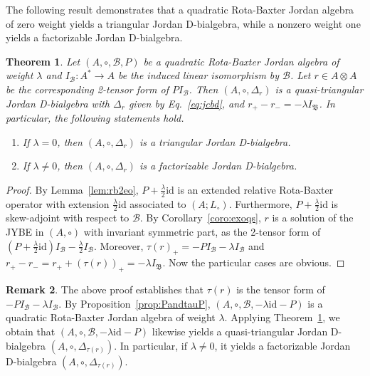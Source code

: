 \documentclass[12pt, reqno, a4paper]{amsart}
\newtheorem{theorem}{Theorem}[section]
\theoremstyle{definition}
\newtheorem{remark}[theorem]{Remark}
\newcommand{\id}{\mathrm{id}}
\begin{document}
The following result demonstrates that a quadratic Rota-Baxter Jordan algebra of zero weight yields a triangular Jordan D-bialgebra, while a nonzero weight one yields a factorizable Jordan D-bialgebra.
\begin{theorem}\label{thm:qrbj2qtjb}
	Let $(A, \circ, \mathcal{B}, P)$ be a quadratic Rota-Baxter Jordan algebra of weight $\lambda$ and $I_\mathcal{B}: A^* \to A$ be the induced linear isomorphism by $\mathcal{B}$.
	Let $r\in A \otimes A$ be the corresponding 2-tensor form of $P I_\mathcal{B}$.
	Then $(A, \circ, \Delta_r)$ is a quasi-triangular Jordan D-bialgebra with $\Delta_{r}$ given by Eq.~\eqref{eq:jcbd}, and $r_{+} - r_{-} = -\lambda I_{\mathfrak{B}}$.
	In particular, the following statements hold.
	\begin{enumerate}[label=(\roman*)]
		\item
		    If $\lambda = 0$, then $(A, \circ, \Delta_r)$ is a triangular Jordan D-bialgebra.

		\item
		    If $\lambda \neq 0$, then $(A, \circ, \Delta_r)$ is a factorizable Jordan D-bialgebra.
	\end{enumerate}
\end{theorem}
\begin{proof}
	By Lemma~\ref{lem:rb2eo}, $P + \frac{\lambda}{2}\id$ is an extended relative Rota-Baxter operator with extension $\frac{\lambda}{2}\id$ associated to $(A; L_{\circ})$.
	Furthermore, $P + \frac{\lambda}{2}\id$ is skew-adjoint with respect to $\mathcal{B}$.
	By Corollary~\ref{coro:exoqs}, $r$ is a solution of the JYBE in $(A, \circ)$ with invariant symmetric part, as the 2-tensor form of $(P+\frac{\lambda}{2}\id)I_\mathcal{B} - \frac{\lambda}{2}I_\mathcal{B}$.
	Moreover, $\tau(r)_{+} = -P I_\mathcal{B} - \lambda I_\mathcal{B}$ and $r_{+} - r_{-} = r_{+} + (\tau(r))_{+} = -\lambda I_\mathfrak{B}$.
	Now the particular cases are obvious.
\end{proof}

\begin{remark}\label{rmk:rtr}
	The above proof establishes that $\tau(r)$ is the tensor form of $-P I_\mathcal{B} - \lambda I_\mathcal{B}$.
	By Proposition~\ref{prop:PandtauP}, $(A, \circ, \mathcal{B}, -\lambda \id-P)$ is a quadratic Rota-Baxter Jordan algebra of weight $\lambda$. 
	Applying Theorem~\ref{thm:qrbj2qtjb}, we obtain that $(A, \circ, \mathcal{B}, -\lambda \id-P)$ likewise yields a quasi-triangular Jordan D-bialgebra $(A, \circ, \Delta_{\tau(r)})$.
	In particular, if $\lambda \neq 0$, it yields a factorizable Jordan D-bialgebra $(A, \circ, \Delta_{\tau(r)})$.
\end{remark}
\end{document}
